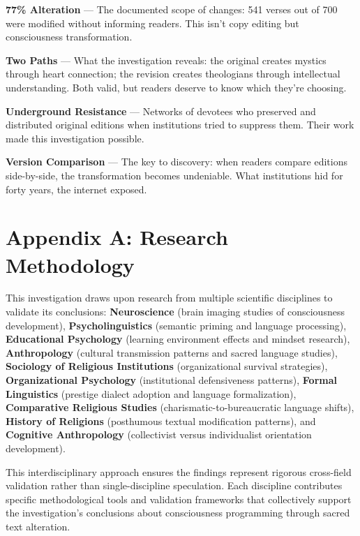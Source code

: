 \documentclass[11pt,twoside]{book}
\begin{document}
\textbf{\textbf{77\% Alteration}} — The documented scope of changes: 541 verses out of 700 were modified without informing readers. This isn't copy editing but consciousness transformation.

\textbf{\textbf{Two Paths}} — What the investigation reveals: the original creates mystics through heart connection; the revision creates theologians through intellectual understanding. Both valid, but readers deserve to know which they're choosing.

\textbf{\textbf{Underground Resistance}} — Networks of devotees who preserved and distributed original editions when institutions tried to suppress them. Their work made this investigation possible.

\textbf{\textbf{Version Comparison}} — The key to discovery: when readers compare editions side-by-side, the transformation becomes undeniable. What institutions hid for forty years, the internet exposed.
\part*{Appendix A: Research Methodology}
\label{sec:org63381d5}
\thispagestyle{plain}

This investigation draws upon research from multiple scientific disciplines to validate its conclusions: \textbf{\textbf{Neuroscience}} (brain imaging studies of consciousness development), \textbf{\textbf{Psycholinguistics}} (semantic priming and language processing), \textbf{\textbf{Educational Psychology}} (learning environment effects and mindset research), \textbf{\textbf{Anthropology}} (cultural transmission patterns and sacred language studies), \textbf{\textbf{Sociology of Religious Institutions}} (organizational survival strategies), \textbf{\textbf{Organizational Psychology}} (institutional defensiveness patterns), \textbf{\textbf{Formal Linguistics}} (prestige dialect adoption and language formalization), \textbf{\textbf{Comparative Religious Studies}} (charismatic-to-bureaucratic language shifts), \textbf{\textbf{History of Religions}} (posthumous textual modification patterns), and \textbf{\textbf{Cognitive Anthropology}} (collectivist versus individualist orientation development). 

This interdisciplinary approach ensures the findings represent rigorous cross-field validation rather than single-discipline speculation. Each discipline contributes specific methodological tools and validation frameworks that collectively support the investigation's conclusions about consciousness programming through sacred text alteration.
\end{document}
